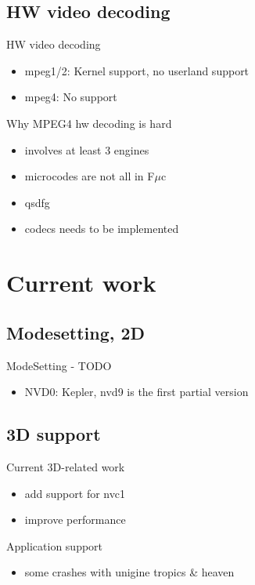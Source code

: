 \documentclass[11pt,english,compress]{beamer}
\begin{document}
	\subsection{HW video decoding}
		\begin{frame}
			\begin{block}{HW video decoding}
				\begin{itemize}
					\item mpeg1/2: Kernel support, no userland support
					\item mpeg4: No support
				\end{itemize}
			\end{block}

			\begin{block}{Why MPEG4 hw decoding is hard}
				\begin{itemize}
					\item involves at least 3 engines
					\item microcodes are not all in F$\mu$c
					\item qsdfg
					\item codecs needs to be implemented
				\end{itemize}
			\end{block}
		\end{frame}

\section{Current work}
	\subsection{Modesetting, 2D}
		\begin{frame}
			\begin{block}{ModeSetting - TODO}
				\begin{itemize}
					\item NVD0: Kepler, nvd9 is the first partial version
				\end{itemize}
			\end{block}
		\end{frame}

	\subsection{3D support}
		\begin{frame}
			\begin{block}{Current 3D-related work}
				\begin{itemize}
					\item add support for nvc1
					\item improve performance
				\end{itemize}
			\end{block}

			\begin{block}{Application support}
				\begin{itemize}
					\item some crashes with unigine tropics \& heaven
				\end{itemize}
			\end{block}
		\end{frame}
\end{document}
